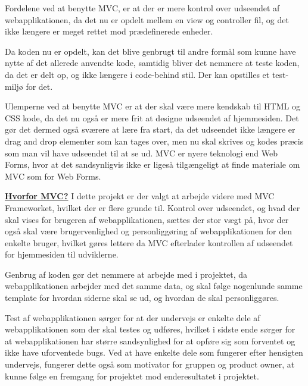 \noindent Fordelene ved at benytte MVC, er at der er mere kontrol over udseendet af webapplikationen, da det nu er opdelt mellem en view og controller fil, og det ikke længere er meget rettet mod prædefinerede enheder. \newline 

\noindent Da koden nu er opdelt, kan det blive genbrugt til andre formål som kunne have nytte af det allerede anvendte kode, samtidig bliver det nemmere at teste koden, da det er delt op, og ikke længere i code-behind stil. Der kan opstilles et test-miljø for det. \newline 

\noindent Ulemperne ved at benytte MVC er at der skal være mere kendskab til HTML og CSS kode, da det nu også er mere frit at designe udseendet af hjemmesiden. Det gør det dermed også sværere at lære fra start, da det udseendet ikke længere er drag and drop elementer som kan tages over, men nu skal skrives og kodes præcis som man vil have udseendet til at se ud. \newline
\noindent MVC er nyere teknologi end Web Forms, hvor at det sandsynligvis ikke er ligeså tilgængeligt at finde materiale om MVC som for Web Forms.\newline

\noindent \textbf{\underline{Hvorfor MVC?}}\newline
\noindent I dette projekt er der valgt at arbejde videre med MVC Frameworket, hvilket der er flere grunde til.\newline
\noindent Kontrol over udseendet, og hvad der skal vises for brugeren af webapplikationen, sættes der stor vægt på, hvor der også skal være brugervenlighed og personliggøring af webapplikationen for den enkelte bruger, hvilket gøres lettere da MVC efterlader kontrollen af udseendet for hjemmesiden til udviklerne.\newline

\noindent Genbrug af koden gør det nemmere at arbejde med i projektet, da webapplikationen arbejder med det samme data, og skal følge nogenlunde samme template for hvordan siderne skal se ud, og hvordan de skal personliggøres. \newline 

\noindent Test af webapplikationen sørger for at der undervejs er enkelte dele af webapplikationen som der skal testes og udføres, hvilket i sidste ende sørger for at webapplikationen har større sandsynlighed for at opføre sig som forventet og ikke have uforventede bugs. Ved at have enkelte dele som fungerer efter hensigten undervejs, fungerer dette også som motivator for gruppen og product owner, at kunne følge en fremgang for projektet mod enderesultatet i projektet.

